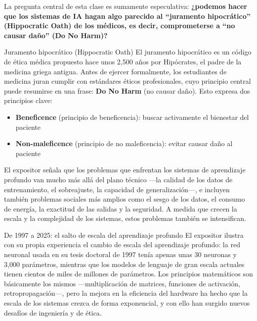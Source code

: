 \documentclass[a4paper]{article}
\begin{document}
La pregunta central de esta clase es sumamente especulativa: \textbf{¿podemos hacer que los sistemas de IA hagan algo parecido al ``juramento hipocrático'' (Hippocratic Oath) de los médicos, es decir, comprometerse a ``no causar daño'' (Do No Harm)?}

\begin{importantbox}{Juramento hipocrático (Hippocratic Oath)}
El juramento hipocrático es un código de ética médica propuesto hace unos 2,500 años por Hipócrates, el padre de la medicina griega antigua. Antes de ejercer formalmente, los estudiantes de medicina juran cumplir con estándares éticos profesionales, cuyo principio central puede resumirse en una frase: \textbf{Do No Harm} (no causar daño). Esto expresa dos principios clave:
\begin{itemize}
    \item \textbf{Beneficence} (principio de beneficencia): buscar activamente el bienestar del paciente
    \item \textbf{Non-maleficence} (principio de no maleficencia): evitar causar daño al paciente
\end{itemize}
\end{importantbox}

El expositor señala que los problemas que enfrentan los sistemas de aprendizaje profundo van mucho más allá del plano técnico —la calidad de los datos de entrenamiento, el sobreajuste, la capacidad de generalización—, e incluyen también problemas sociales más amplios como el sesgo de los datos, el consumo de energía, la exactitud de las salidas y la seguridad. A medida que crecen la escala y la complejidad de los sistemas, estos problemas también se intensifican.

\begin{knowledgebox}{De 1997 a 2025: el salto de escala del aprendizaje profundo}
El expositor ilustra con su propia experiencia el cambio de escala del aprendizaje profundo: la red neuronal usada en su tesis doctoral de 1997 tenía apenas unas 30 neuronas y 3,000 parámetros, mientras que los modelos de lenguaje de gran escala actuales tienen cientos de miles de millones de parámetros. Los principios matemáticos son básicamente los mismos —multiplicación de matrices, funciones de activación, retropropagación—, pero la mejora en la eficiencia del hardware ha hecho que la escala de los sistemas crezca de forma exponencial, y con ello han surgido nuevos desafíos de ingeniería y de ética.
\end{knowledgebox}
\end{document}
